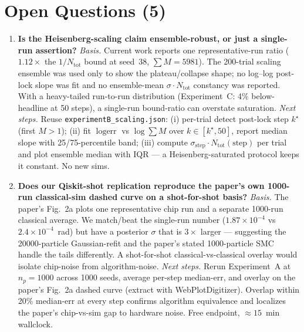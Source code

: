 \section*{Open Questions (5)}

\begin{enumerate}

\item \textbf{Is the Heisenberg-scaling claim ensemble-robust, or just a
    single-run assertion?}
  \emph{Basis.}  Current work reports one representative-run ratio
  ($1.12\times$ the $1/N_{\text{tot}}$ bound at seed~38, $\sum M=5981$).  The
  200-trial scaling ensemble was used only to show the plateau/collapse
  shape; no log--log post-lock slope was fit and no ensemble-mean
  $\sigma\cdot N_{\text{tot}}$ constancy was reported.  With a
  heavy-tailed run-to-run distribution (Experiment~C: 4\%
  below-headline at 50 steps), a single-run bound-ratio can overstate
  saturation.
  \emph{Next steps.}  Reuse \texttt{experimentB\_scaling.json}: (i) per-trial
  detect post-lock step $k^\star$ (first $M>1$); (ii) fit $\log\text{err}$
  vs $\log\sum M$ over $k\in[k^\star,50]$, report median slope with
  25/75-percentile band; (iii) compute $\sigma_{\text{step}}\cdot
  N_{\text{tot}}(\text{step})$ per trial and plot ensemble median with
  IQR --- a Heisenberg-saturated protocol keeps it constant.  No new sims.

\item \textbf{Does our Qiskit-shot replication reproduce the paper's own
    1000-run classical-sim dashed curve on a shot-for-shot basis?}
  \emph{Basis.}  The paper's Fig.~2a plots one representative chip run and a
  separate 1000-run classical average.  We match/beat the single-run
  number ($1.87\times 10^{-4}$ vs $2.4\times 10^{-4}$~rad) but have a
  posterior $\sigma$ that is $3\times$ larger --- suggesting the
  20000-particle Gaussian-refit and the paper's stated 1000-particle SMC
  handle the tails differently.  A shot-for-shot classical-vs-classical
  overlay would isolate chip-noise from algorithm-noise.
  \emph{Next steps.}  Rerun Experiment~A at $n_p=1000$ across 1000 seeds,
  average per-step median-err, and overlay on the paper's Fig.~2a dashed
  curve (extract with WebPlotDigitizer).  Overlap within 20\%
  median-err at every step confirms algorithm equivalence and localizes
  the paper's chip-vs-sim gap to hardware noise.  Free endpoint,
  $\approx 15$~min wallclock.


\end{enumerate}
